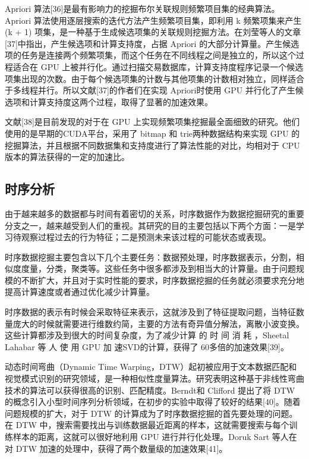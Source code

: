 \documentclass{article}
\begin{document}
\begin{multicols}{2}
    Apriori 算法[36]是最有影响力的挖掘布尔关联规则频繁项目集的经典算法。Apriori 算法使用逐层搜索的迭代方法产生频繁项目集，即利用 k 频繁项集来产生(k + 1) 项集，是一种基于生成候选项集的关联规则挖掘方法。在刘莹等人的文章[37]中指出，产生候选项和计算支持度，占据 Apriori 的大部分计算量。产生候选项的任务是连接两个频繁项集，而这个任务在不同线程之间是独立的，所以这个过程适合在 GPU 上被并行化。通过扫描交易数据库，计算支持度程序记录一个候选项集出现的次数。由于每个候选项集的计数与其他项集的计数相对独立，同样适合于多线程并行。所以文献[37]的作者们在实现 Apriori时使用 GPU 并行化了产生候选项和计算支持度这两个过程，取得了显著的加速效果。
    
    文献[38]是目前发现的对于在 GPU 上实现频繁项集挖掘最全面细致的研究。他们使用的是早期的CUDA平台，采用了 bitmap 和 trie两种数据结构来实现 GPU 的挖掘算法，并且根据不同数据集和支持度进行了算法性能的对比，均相对于 CPU 版本的算法获得的一定的加速比。

    \subsection{时序分析}
    由于越来越多的数据都与时间有着密切的关系，时序数据作为数据挖掘研究的重要分支之一，越来越受到人们的重视。其研究的目的主要包括以下两个方面：一是学习待观察过程过去的行为特征；二是预测未来该过程的可能状态或表现。
    
    时序数据挖掘主要包含以下几个主要任务：数据预处理，时序数据表示，分割，相似度度量，分类，聚类等。这些任务中很多都涉及到相当大的计算量。由于问题规模的不断扩大，并且对于实时性能的要求，时序数据挖掘的任务就必须要求充分地提高计算速度或者通过优化减少计算量。
    
    时序数据的表示有时候会采取特征来表示，这就涉及到了特征提取问题，当特征数量庞大的时候就需要进行维数约简，主要的方法有奇异值分解法，离散小波变换。这些计算都涉及到很大的时间复杂度，为了减少计算 的 时 间 消 耗 ，Sheetal Lahabar 等 人 使 用 GPU 加 速SVD的计算，获得了 60多倍的加速效果[39]。
    
    动态时间弯曲（Dynamic Time Warping，DTW）起初被应用于文本数据匹配和视觉模式识别的研究领域，是一种相似性度量算法。研究表明这种基于非线性弯曲技术的算法可以获得很高的识别、匹配精度。Berndt和 Clifford 提出了将 DTW 的概念引入小型时间序列分析领域，在初步的实验中取得了较好的结果[40]。随着问题规模的扩大，对于 DTW 的计算成为了时序数据挖掘的首先要处理的问题。在 DTW 中，搜索需要找出与训练数据最近距离的样本，这就需要搜索与每个训练样本的距离，这就可以很好地利用 GPU 进行并行化处理。Doruk Sart 等人在对 DTW 加速的处理中，获得了两个数量级的加速效果[41]。
    

\end{multicols}
\end{document}
